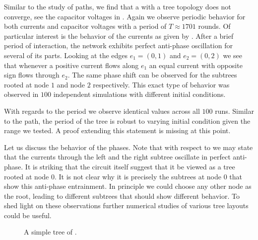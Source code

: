		Similar to the study of paths, we find that a \Pn with a tree topology does not converge, see the capacitor voltages in . Again we observe periodic behavior for both currents and capacitor voltages with a period of $T \approx 1701$ rounds. Of particular interest is the behavior of the currents as given by . After a brief period of interaction, the network exhibits perfect anti-phase oscillation for several of its parts. Looking at the edges $e_1 = (0,1)$ and $e_2 = (0,2)$ we see that whenever a positive current flows along $e_1$ an equal current with opposite sign flows through $e_2$. The same phase shift can be observed for the subtrees rooted at node $1$ and node $2$ respectively. This exact type of behavior was observed in $100$ independent simulations with different initial conditions.

		With regards to the period we observe identical values across all $100$ runs. Similar to the path, the period of the tree is robust to varying initial condition given the range we tested. A proof extending this statement is missing at this point.

		Let us discuss the behavior of the phases. Note that with respect to  we may state that the currents through the left and the right subtree oscillate in perfect anti-phase. It is striking that the circuit itself suggest that it be viewed as a tree rooted at node $0$. It is not clear why it is precisely the subtrees at node $0$ that show this anti-phase entrainment. In principle we could choose any other node as the root, leading to different subtrees that should show different behavior. To shed light on these observations further numerical studies of various tree layouts could be useful.

		\begin{figure}
			\centering
			\qquad
			\newline
			\qquad
			
					
			\caption[Tree simulations]{A simple tree of \Pes.}
			\label{fig:tree}
		\end{figure}

